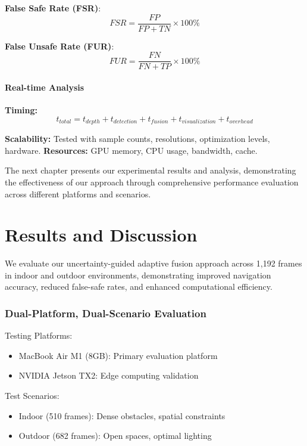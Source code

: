 \documentclass[12pt,oneside]{book}
\begin{document}
\textbf{False Safe Rate (FSR)}:
\begin{equation}
FSR = \frac{FP}{FP+TN} \times 100\%
\end{equation}

\textbf{False Unsafe Rate (FUR)}:
\begin{equation}
FUR = \frac{FN}{FN+TP} \times 100\%
\end{equation}

\subsubsection{Real-time Analysis}

\textbf{Timing:}
\begin{equation}
t_{total} = t_{depth}+t_{detection}+t_{fusion}+t_{visualization}+t_{overhead}
\end{equation}

\textbf{Scalability:} Tested with sample counts, resolutions, optimization levels, hardware.
\textbf{Resources:} GPU memory, CPU usage, bandwidth, cache.


\vspace{12pt}
The next chapter presents our experimental results and analysis, demonstrating the effectiveness of our approach through comprehensive performance evaluation across different platforms and scenarios.

\chapter{Results and Discussion}

We evaluate our uncertainty-guided adaptive fusion approach across 1,192 frames in indoor and outdoor environments, demonstrating improved navigation accuracy, reduced false-safe rates, and enhanced computational efficiency.

\subsection{Dual-Platform, Dual-Scenario Evaluation}

Testing Platforms:
\begin{itemize}
\item MacBook Air M1 (8GB): Primary evaluation platform
\item NVIDIA Jetson TX2: Edge computing validation
\end{itemize}

Test Scenarios:
\begin{itemize}
\item Indoor (510 frames): Dense obstacles, spatial constraints
\item Outdoor (682 frames): Open spaces, optimal lighting
\end{itemize}
\end{document}
